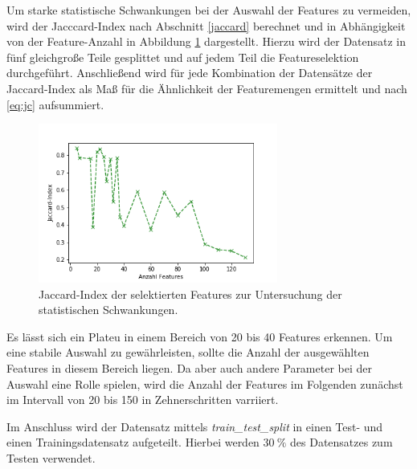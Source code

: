 Um starke statistische Schwankungen bei der Auswahl der Features zu vermeiden, wird der Jacccard-Index nach Abschnitt \ref{jaccard} berechnet und in Abhängigkeit von der Feature-Anzahl in Abbildung \ref{fig:jaccard} dargestellt. Hierzu wird der Datensatz in fünf gleichgroße Teile gesplittet und auf jedem Teil die Featureselektion durchgeführt. Anschließend wird für jede Kombination der Datensätze der Jaccard-Index als Maß für die Ähnlichkeit der Featuremengen ermittelt und nach \eqref{eq:jc} aufsummiert.
\begin{figure}
  \centering
  \includegraphics[width=0.7\textwidth]{plots/jaccard.png}
  \caption{Jaccard-Index der selektierten Features zur Untersuchung der statistischen Schwankungen.}
  \label{fig:jaccard}
\end{figure}
\FloatBarrier
Es lässt sich ein Plateu in einem Bereich von 20 bis 40 Features erkennen. Um eine stabile Auswahl zu gewährleisten, sollte die Anzahl der ausgewählten Features in diesem Bereich liegen. Da aber auch andere Parameter bei der Auswahl eine Rolle spielen, wird die Anzahl der Features im Folgenden zunächst im Intervall von 20 bis 150 in Zehnerschritten varriiert.

Im Anschluss wird der Datensatz mittels \textit{train\_test\_split} in einen Test- und einen Trainingsdatensatz aufgeteilt. Hierbei werden $\SI{30}{\%}$ des Datensatzes zum Testen verwendet.

